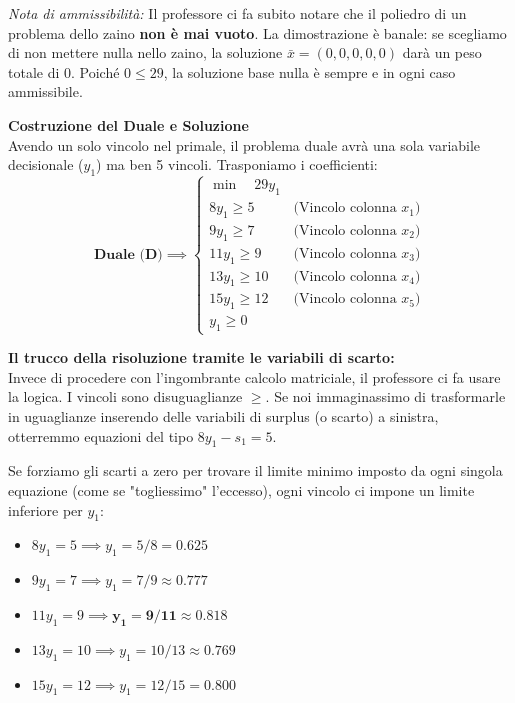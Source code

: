 \documentclass[12pt, a4paper]{article}
\begin{document}
	\textit{Nota di ammissibilità:} Il professore ci fa subito notare che il poliedro di un problema dello zaino \textbf{non è mai vuoto}. La dimostrazione è banale: se scegliamo di non mettere nulla nello zaino, la soluzione $\bar{x} = (0,0,0,0,0)$ darà un peso totale di $0$. Poiché $0 \leq 29$, la soluzione base nulla è sempre e in ogni caso ammissibile.
	
	\vspace{0.4cm}
	\textbf{Costruzione del Duale e Soluzione}\\
	Avendo un solo vincolo nel primale, il problema duale avrà una sola variabile decisionale ($y_1$) ma ben 5 vincoli. Trasponiamo i coefficienti:
	\[
	\textbf{Duale (D)} \implies
	\begin{cases}
		\min \quad 29y_1 \\[6pt]
		8y_1 \geq 5 \quad &\text{(Vincolo colonna } x_1) \\
		9y_1 \geq 7 \quad &\text{(Vincolo colonna } x_2) \\
		11y_1 \geq 9 \quad &\text{(Vincolo colonna } x_3) \\
		13y_1 \geq 10 \quad &\text{(Vincolo colonna } x_4) \\
		15y_1 \geq 12 \quad &\text{(Vincolo colonna } x_5) \\[6pt]
		y_1 \geq 0
	\end{cases}
	\]
	
	\textbf{Il trucco della risoluzione tramite le variabili di scarto:}\\
	Invece di procedere con l'ingombrante calcolo matriciale, il professore ci fa usare la logica. I vincoli sono disuguaglianze $\geq$. Se noi immaginassimo di trasformarle in uguaglianze inserendo delle variabili di surplus (o scarto) a sinistra, otterremmo equazioni del tipo $8y_1 - s_1 = 5$. 
	
	Se forziamo gli scarti a zero per trovare il limite minimo imposto da ogni singola equazione (come se "togliessimo" l'eccesso), ogni vincolo ci impone un limite inferiore per $y_1$:
	\begin{itemize}[label=$\circ$, itemsep=2pt, leftmargin=1.5cm]
		\item $8y_1 = 5 \implies y_1 = 5/8 = 0.625$
		\item $9y_1 = 7 \implies y_1 = 7/9 \approx 0.777$
		\item $11y_1 = 9 \implies \mathbf{y_1 = 9/11 \approx 0.818}$
		\item $13y_1 = 10 \implies y_1 = 10/13 \approx 0.769$
		\item $15y_1 = 12 \implies y_1 = 12/15 = 0.800$
	\end{itemize}
	
\end{document}
